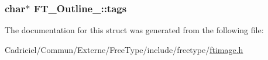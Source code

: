 \hypertarget{struct_f_t___outline___ac84ca66907361e1f49ec11c14720087a}{
\subsubsection[{tags}]{\setlength{\rightskip}{0pt plus 5cm}char$\ast$ F\-T\-\_\-\-Outline\-\_\-\-::tags}}\label{struct_f_t___outline___ac84ca66907361e1f49ec11c14720087a}


The documentation for this struct was generated from the following file\-:\begin{DoxyCompactItemize}
\item 
Cadriciel/\-Commun/\-Externe/\-Free\-Type/include/freetype/\hyperlink{ftimage_8h}{ftimage.\-h}\end{DoxyCompactItemize}
